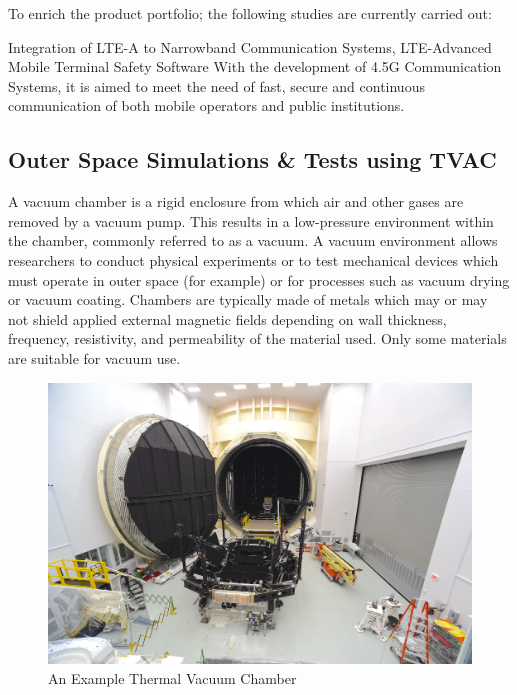 	To enrich the product portfolio; the following studies are currently carried out:

	Integration of LTE-A to Narrowband Communication Systems,
LTE-Advanced Mobile Terminal Safety Software  
With the development of 4.5G Communication Systems, it is aimed to meet the need of fast, secure and continuous communication of both mobile operators and public institutions.


\vfill


\subsection{Outer Space Simulations \& Tests using TVAC  }

\- \indent
	A vacuum chamber is a rigid enclosure from which air and other gases are removed by a vacuum pump. This results in a low-pressure environment within the chamber, commonly referred to as a vacuum. A vacuum environment allows researchers to conduct physical experiments or to test mechanical devices which must operate in outer space (for example) or for processes such as vacuum drying or vacuum coating. Chambers are typically made of metals which may or may not shield applied external magnetic fields depending on wall thickness, frequency, resistivity, and permeability of the material used. Only some materials are suitable for vacuum use\cite{tvac}.


\begin{figure}[H]
	\center
	\setlength{\unitlength}{\textwidth} 
	\includegraphics[width=1.0\unitlength]{tvac}
	\caption{\label{fig:tvac}An Example Thermal Vacuum Chamber }
\end{figure}


